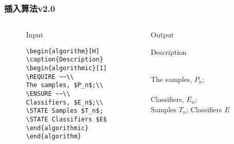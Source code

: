 \begin{frame}[fragile]\frametitle{插入算法v2.0}
  \begin{columns}
    \begin{column}{0.05\textwidth}
    \end{column}
    \begin{column}{0.45\textwidth}
    \begin{block}{Input}
    \begin{verbatim}
\begin{algorithm}[H]
\caption{Description}
\begin{algorithmic}[1]
\REQUIRE ~~\\
The samples, $P_n$;\\
\ENSURE ~~\\
Classifiers, $E_n$;\\
\STATE Samples $T_n$;
\STATE Classifiers $E$
\end{algorithmic}
\end{algorithm}
    \end{verbatim}
    \end{block}
    \end{column}
    \begin{column}{0.025\textwidth}
    \end{column}
    \begin{column}{0.45\textwidth}
    \begin{block}{Output}
\begin{algorithm}[H]
\caption{Description}
\begin{algorithmic}[1]
\REQUIRE ~~\\
The samples, $P_n$;\\
\ENSURE ~~\\
Classifiers, $E_n$;\\
\STATE Samples $T_n$;
\STATE Classifiers $E$
\end{algorithmic}
\end{algorithm}
    \end{block}
    \end{column}
    \begin{column}{0.025\textwidth}
    \end{column}
  \end{columns}
\end{frame}

